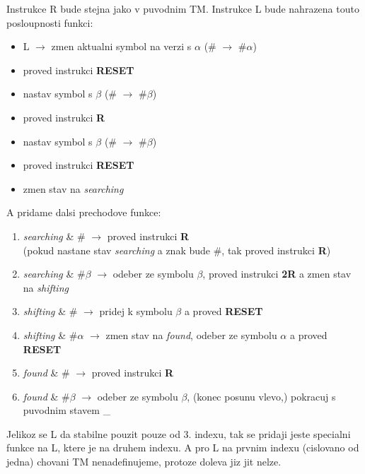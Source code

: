 \documentclass[a4paper]{article}
\begin{document}
Instrukce R bude stejna jako v puvodnim TM. Instrukce L bude nahrazena touto posloupnosti funkci:
\begin{itemize}
    \item L $\rightarrow$ zmen aktualni symbol na verzi s $\alpha$ (\# $\rightarrow$ \#$\alpha$)
    \item proved instrukci \textbf{RESET}
    \item nastav symbol s $\beta$ (\# $\rightarrow$ \#$\beta$)
    \item proved instrukci \textbf{R}
    \item nastav symbol s $\beta$ (\# $\rightarrow$ \#$\beta$)
    \item proved instrukci \textbf{RESET}
    \item zmen stav na \textit{searching}
\end{itemize}
A pridame dalsi prechodove funkce:
\begin{enumerate}
    \item \textit{searching} \& \# $\rightarrow$ proved instrukci \textbf{R}\\
    (pokud nastane stav \textit{searching} a znak bude \#, tak proved instrukci \textbf{R})
    \item \textit{searching} \& \#$\beta$ $\rightarrow$ odeber ze symbolu $\beta$, proved instrukci \textbf{2R} a zmen stav na \textit{shifting}
    \item \textit{shifting} \& \# $\rightarrow$ pridej k symbolu $\beta$ a proved \textbf{RESET}
    \item \textit{shifting} \& \#$\alpha$ $\rightarrow$ zmen stav na \textit{found}, odeber ze symbolu $\alpha$ a proved \textbf{RESET}
    \item \textit{found} \& \# $\rightarrow$ proved instrukci \textbf{R}
    \item \textit{found} \& \#$\beta$ $\rightarrow$ odeber ze symbolu $\beta$, (konec posunu vlevo,) pokracuj s puvodnim stavem \_
\end{enumerate}

Jelikoz se L da stabilne pouzit pouze od 3. indexu, tak se pridaji jeste specialni funkce na L, ktere je na druhem indexu.
A pro L na prvnim indexu (cislovano od jedna) chovani TM nenadefinujeme, protoze doleva jiz jit nelze. 
\end{document}

